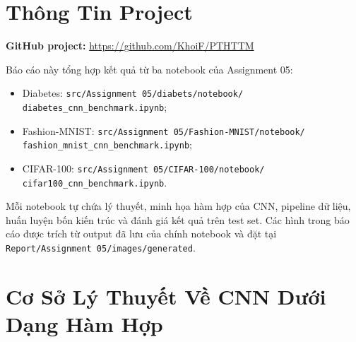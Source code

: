\documentclass[12pt,a4paper]{report}
\newcommand{\modelpath}[1]{\texttt{#1}}
\begin{document}
\tableofcontents
\newpage
\listoffigures
\newpage
\listoftables
\newpage
{}

\chapter*{Thông Tin Project}

\noindent\textbf{GitHub project:} \url{https://github.com/KhoiF/PTHTTM}

\vspace{0.4cm}
\noindent
Báo cáo này tổng hợp kết quả từ ba notebook của Assignment 05:
\begin{itemize}
    \item Diabetes:
    \modelpath{src/Assignment 05/diabets/notebook/}\\
    \modelpath{diabetes\_cnn\_benchmark.ipynb};
    \item Fashion-MNIST:
    \modelpath{src/Assignment 05/Fashion-MNIST/notebook/}\\
    \modelpath{fashion\_mnist\_cnn\_benchmark.ipynb};
    \item CIFAR-100:
    \modelpath{src/Assignment 05/CIFAR-100/notebook/}\\
    \modelpath{cifar100\_cnn\_benchmark.ipynb}.
\end{itemize}

\noindent
Mỗi notebook tự chứa lý thuyết, minh họa hàm hợp của CNN, pipeline dữ liệu,
huấn luyện bốn kiến trúc và đánh giá kết quả trên test set.
Các hình trong báo cáo được trích từ output đã lưu của chính notebook và đặt tại
\modelpath{Report/Assignment 05/images/generated}.
\newpage

\chapter{Cơ Sở Lý Thuyết Về CNN Dưới Dạng Hàm Hợp}
\end{document}
